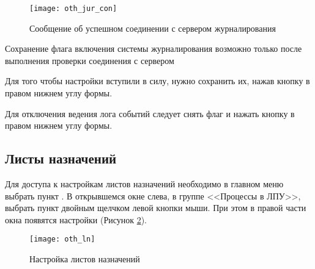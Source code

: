 \begin{figure}[ht]\centering
 \texttt{[image: oth\_jur\_con]}
 \caption{Сообщение об успешном соединении с сервером журналирования}
 \label{img_oth_jur_con}
\end{figure}

\begin{vnim}
Сохранение флага включения системы журналирования возможно только после выполнения проверки соединения с сервером
\end{vnim}

Для того чтобы настройки вступили в силу, нужно сохранить их, нажав кнопку   в правом нижнем углу формы.

Для отключения ведения лога событий следует снять флаг  и нажать кнопку  в правом нижнем углу формы.

\subsection{Листы назначений} 

Для доступа к настройкам листов назначений необходимо в главном меню выбрать пункт . В открывшемся окне слева, в группе <<Процессы в ЛПУ>>, выбрать пункт  двойным щелчком левой кнопки мыши. При этом в правой части окна появятся настройки (Рисунок \ref{img_oth_ln}).

\begin{figure}[ht]\centering
 \texttt{[image: oth\_ln]}
 \caption{Настройка листов назначений}
 \label{img_oth_ln}
\end{figure}

